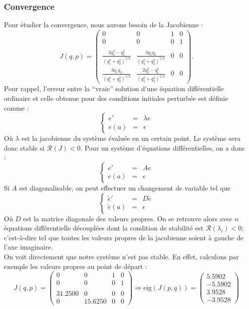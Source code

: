\subsubsection{Convergence}
Pour étudier la convergence, nous aurons besoin de la Jacobienne :
$$J(q,p) =
\begin{pmatrix}
  0 & 0 & 1 & 0\\
  0 & 0 & 0 & 1\\\\
  \frac{2q_1^2 - q_2^2}{(q_1^2+q_2^2)^{5/2}} & \frac{3q_1q_2}{(q_1^2+q_2^2)^{5/2}} & 0 & 0 \\
  \frac{3q_1q_2}{(q_1^2+q_2^2)^{5/2}} & \frac{2q_2^2 - q_1^2}{(q_1^2+q_2^2)^{5/2}} & 0 & 0
\end{pmatrix}.
$$
Pour rappel, l'erreur entre la ``vraie'' solution d'une équation différentielle ordinaire et celle obtenue pour des conditions initiales perturbée est définie comme :
$$\left\lbrace
\begin{array}{ccc}
e' &=& \lambda e\\
e(a) &=& \epsilon
\end{array}
\right.
$$
Où $\lambda$ est la jacobienne du système évaluée en un certain point. Le système sera donc stable si $\mathcal{R} (J) <0$. Pour un système d'équations différentielles, on a donc :
$$\left\lbrace
\begin{array}{ccc}
e' &=& A e\\
e(a) &=& \epsilon
\end{array}
\right.
$$
Si $A$ est diagonalisable, on peut effectuer un changement de variable tel que
$$\left\lbrace
\begin{array}{ccc}
\tilde{e} ' &=& D \tilde{e}\\
\tilde{e} (a) &=& \epsilon
\end{array}
\right.
$$
Où $D$ est la matrice diagonale des valeurs propres. On se retrouve alors avec $n$ équations différentielle découplées dont la condition de stabilité est $\mathcal{R} (\lambda_i) <0$; c'est-à-dire tel que toutes les valeurs propres de la jacobienne soient à gauche de l'axe imaginaire.\\
On voit directement que notre système n'est pas stable. En effet, calculons par exemple les valeurs propres au point de départ :
$$J(q,p) =
\begin{pmatrix}
0 & 0 & 1 & 0\\
0 & 0 & 0 & 1\\\\
 31.2500 & 0  & 0 & 0 \\
0 & 15.6250 & 0 & 0
\end{pmatrix}
\Longrightarrow \mathrm{eig}(J(p,q))=
\begin{pmatrix}
5.5902\\
-5.5902\\
3.9528\\
-3.9528
\end{pmatrix}
$$

